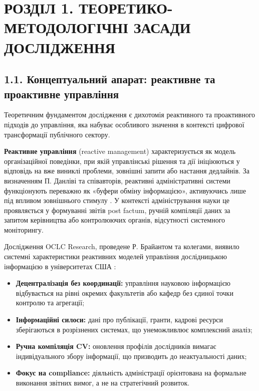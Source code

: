 \section*{РОЗДІЛ 1. ТЕОРЕТИКО-МЕТОДОЛОГІЧНІ ЗАСАДИ ДОСЛІДЖЕННЯ}

\subsection*{1.1. Концептуальний апарат: реактивне та проактивне управління}

Теоретичним фундаментом дослідження є дихотомія реактивного та проактивного підходів до управління, яка набуває особливого значення в контексті цифрової трансформації публічного сектору.

\textbf{Реактивне управління} (reactive management) характеризується як модель організаційної поведінки, при якій управлінські рішення та дії ініціюються у відповідь на вже виниклі проблеми, зовнішні запити або настання дедлайнів. За визначенням П. Данліві та співавторів, реактивні адміністративні системи функціонують переважно як «буфери обміну інформацією», активуючись лише під впливом зовнішнього стимулу \cite{Dunleavy2006DigitalEraGovernance}. У контексті адміністрування науки це проявляється у формуванні звітів post factum, ручній компіляції даних за запитом керівництва або контролюючих органів, відсутності системного моніторингу.

Дослідження OCLC Research, проведене Р. Брайантом та колегами, виявило системні характеристики реактивних моделей управління дослідницькою інформацією в університетах США \cite{Bryant2017RIMDefining}:

\begin{itemize}[leftmargin=*,itemsep=0.2em]
\item \textbf{Децентралізація без координації:} управління науковою інформацією відбувається на рівні окремих факультетів або кафедр без єдиної точки контролю та агрегації;
\item \textbf{Інформаційні силоси:} дані про публікації, гранти, кадрові ресурси зберігаються в розрізнених системах, що унеможливлює комплексний аналіз;
\item \textbf{Ручна компіляція CV:} оновлення профілів дослідників вимагає індивідуального збору інформації, що призводить до неактуальності даних;
\item \textbf{Фокус на compliance:} діяльність адміністрації орієнтована на формальне виконання звітних вимог, а не на стратегічний розвиток.
\end{itemize}

